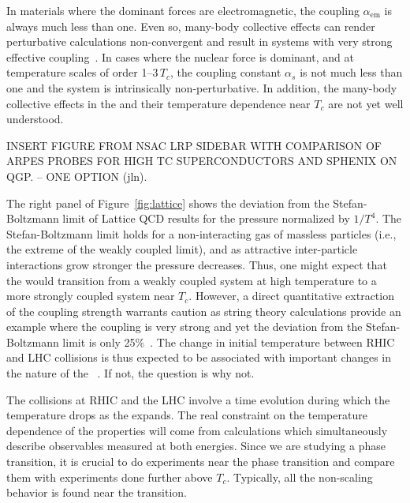 In materials where the dominant forces are electromagnetic, the
coupling $\alpha_{\mathrm{em}}$ is always much less than one.  Even so,
many-body collective effects can render perturbative calculations
non-convergent and result in systems with very strong
effective coupling~\cite{Adams:2012th}.  In cases where the nuclear force is
dominant, and at temperature scales of order 1--3\,$T_{c}$, the
coupling constant $\alpha_{s}$ is not much less than one and the
system is intrinsically non-perturbative.  In addition, the many-body
collective effects in the \qgp and their temperature dependence near
$T_{c}$ are not yet well understood.

INSERT FIGURE FROM NSAC LRP SIDEBAR WITH COMPARISON OF ARPES PROBES FOR HIGH TC SUPERCONDUCTORS AND SPHENIX ON QGP.   -- ONE OPTION (jln).

The right panel of Figure~\ref{fig:lattice} shows the deviation from
the Stefan-Boltzmann limit of Lattice QCD results for the pressure
normalized by $1/T^{4}$.  The Stefan-Boltzmann limit holds for a
non-interacting gas of massless particles (i.e., the extreme of the
weakly coupled limit), and as attractive inter-particle interactions
grow stronger the pressure decreases.  Thus, one might expect that the
\qgp would transition from a weakly coupled system at high temperature
to a more strongly coupled system near $T_{c}$.  However, a direct
quantitative extraction of the coupling strength warrants caution as
string theory calculations provide an example where the coupling is
very strong and yet the deviation from the Stefan-Boltzmann limit is
only 25\%~\cite{Gubser:2009fc,Gubser:1996de}.  The change in initial
temperature between RHIC and LHC collisions is thus expected to be
associated with important changes in the nature of the
\qgp~\cite{Wiedemann:2009sa}.  If not, the question is why not.

The collisions at RHIC and the LHC involve a time evolution during
which the temperature drops as the \qgp expands.  The real constraint
on the temperature dependence of the \qgp properties will come from
calculations which simultaneously describe observables measured at both energies.
Since we are studying a phase transition, it is crucial to do
experiments near the phase transition and compare them with
experiments done further above $T_c$.  Typically, all the non-scaling
behavior is found near the transition.

